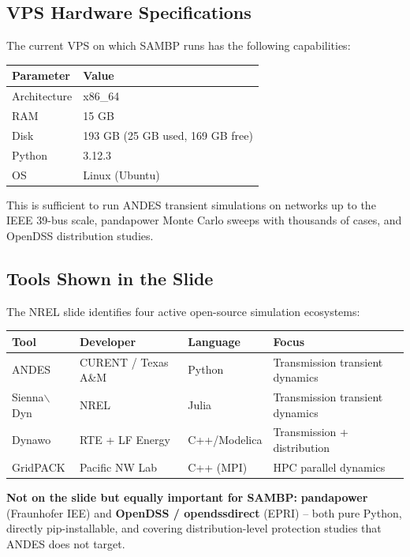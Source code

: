 \documentclass[11pt,a4paper]{article}
\begin{document}
\subsection{VPS Hardware Specifications}
The current VPS on which SAMBP runs has the following capabilities:

\begin{center}
\begin{tabular}{ll}
\toprule
\textbf{Parameter} & \textbf{Value} \\
\midrule
Architecture & x86\_64 \\
RAM          & 15 GB \\
Disk         & 193 GB (25 GB used, 169 GB free) \\
Python       & 3.12.3 \\
OS           & Linux (Ubuntu) \\
\bottomrule
\end{tabular}
\end{center}

This is sufficient to run ANDES transient simulations on networks up to
the IEEE 39-bus scale, pandapower Monte Carlo sweeps with thousands of
cases, and OpenDSS distribution studies.

\subsection{Tools Shown in the Slide}

The NREL slide identifies four active open-source simulation ecosystems:

\begin{center}
\begin{tabular}{llll}
\toprule
\textbf{Tool} & \textbf{Developer} & \textbf{Language} & \textbf{Focus} \\
\midrule
ANDES             & CURENT / Texas A\&M & Python            & Transmission transient dynamics \\
Sienna$\backslash$Dyn & NREL           & Julia             & Transmission transient dynamics \\
Dynawo            & RTE + LF Energy     & C++/Modelica      & Transmission + distribution \\
GridPACK          & Pacific NW Lab      & C++ (MPI)         & HPC parallel dynamics \\
\bottomrule
\end{tabular}
\end{center}

\begin{notebox}
\textbf{Not on the slide but equally important for SAMBP:}
\textbf{pandapower} (Fraunhofer IEE) and \textbf{OpenDSS / opendssdirect}
(EPRI) -- both pure Python, directly pip-installable, and covering
distribution-level protection studies that ANDES does not target.
\end{notebox}
\end{document}
